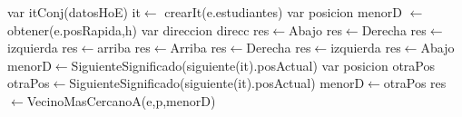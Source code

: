 \begin{algorithm}[H]
\begin{algorithmic}[1]
 
	\State var itConj(datosHoE) it$\gets$ crearIt(e.estudiantes) 
	\State var posicion menorD $\gets$ obtener(e.posRapida,h)	
	\State var direccion direcc 
	 
		 
			 
				\State res$\gets$Abajo \Else {}
				 
					\State res$\gets$Derecha \Else {}
					 
						\State res$\gets$izquierda \Else {}
						\State res$\gets$arriba 
					\EndIf
				\EndIf
			\EndIf
		\Else
			 
				\State res$\gets$Arriba \Else {}
				 
					\State res$\gets$Derecha \Else {}
					 
						\State res$\gets$izquierda \Else {}
						\State res$\gets$Abajo 
					\EndIf
				\EndIf
			\EndIf
		\EndIf
	\Else
		\State menorD$\gets$SiguienteSignificado(siguiente(it).posActual) 
		\State var posicion otraPos 
		 
			\State otraPos$\gets$SiguienteSignificado(siguiente(it).posActual) 
			 
				\State menorD$\gets$otraPos 
			\EndIf
		\EndWhile
		\State res$\gets$VecinoMasCercanoA(e,p,menorD) 
	\EndIf	
\EndFunction
\end{algorithmic}
\end{algorithm}

